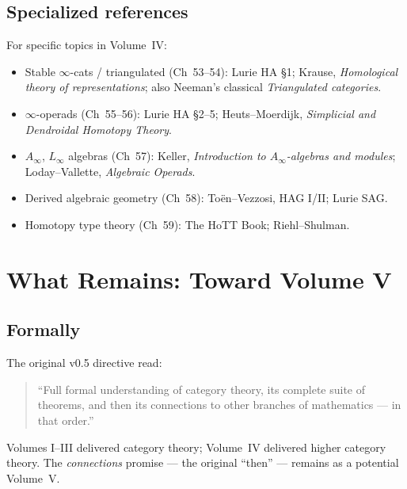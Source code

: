 \subsection{Specialized references}

\begin{remark}
For specific topics in Volume~IV:
\begin{itemize}
  \item Stable $\infty$-cats / triangulated (Ch~53--54): Lurie HA §1;
        Krause, \emph{Homological theory of representations}; also
        Neeman's classical \emph{Triangulated categories}.
  \item $\infty$-operads (Ch~55--56): Lurie HA §2--5; Heuts–Moerdijk,
        \emph{Simplicial and Dendroidal Homotopy Theory}.
  \item $A_\infty$, $L_\infty$ algebras (Ch~57): Keller, \emph{Introduction
        to $A_\infty$-algebras and modules}; Loday–Vallette,
        \emph{Algebraic Operads}.
  \item Derived algebraic geometry (Ch~58): Toën–Vezzosi, HAG I/II;
        Lurie SAG.
  \item Homotopy type theory (Ch~59): The HoTT Book; Riehl–Shulman.
\end{itemize}
\end{remark}


\section{What Remains: Toward Volume V}
\label{sec:toward-vol5}

\subsection{Formally}

The original v0.5 directive read:

\begin{quote}
``Full formal understanding of category theory, its complete suite of
theorems, and then its connections to other branches of mathematics —
in that order.''
\end{quote}

Volumes I--III delivered category theory; Volume~IV delivered higher
category theory. The \emph{connections} promise — the original ``then''
— remains as a potential Volume~V.

